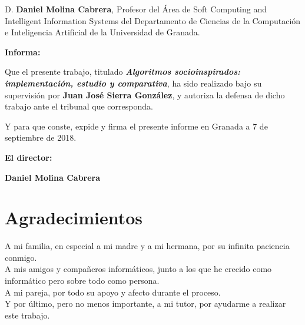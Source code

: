 D. \textbf{Daniel Molina Cabrera}, Profesor del Área de Soft Computing and Intelligent Information Systems del Departamento de Ciencias de la Computación e Inteligencia Artificial de la Universidad de Granada.

\vspace{0.5cm}

\textbf{Informa:}

\vspace{0.5cm}

Que el presente trabajo, titulado \textit{\textbf{Algoritmos socioinspirados: implementación, estudio y comparativa}},
ha sido realizado bajo su supervisión por \textbf{Juan José Sierra González}, y autoriza la defensa de dicho trabajo ante el tribunal
que corresponda.

\vspace{0.5cm}

Y para que conste, expide y firma el presente informe en Granada a 7 de septiembre de 2018.

\vspace{1cm}

\textbf{El director:}

\vspace{5cm}

\noindent \textbf{Daniel Molina Cabrera}

\chapter*{Agradecimientos}
\thispagestyle{empty}

       \vspace{1cm}


A mi familia, en especial a mi madre y a mi hermana, por su infinita paciencia conmigo.\\

A mis amigos y compañeros informáticos, junto a los que he crecido como informático pero sobre todo como persona.\\

A mi pareja, por todo su apoyo y afecto durante el proceso.\\

Y por último, pero no menos importante, a mi tutor, por ayudarme a realizar este trabajo.\\